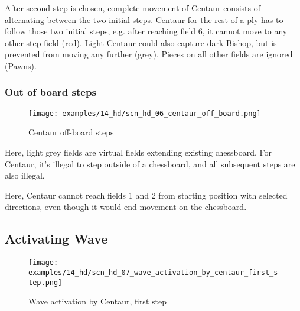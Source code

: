 After second step is chosen, complete movement of Centaur consists of alternating
between the two initial steps. Centaur for the rest of a ply has to follow those two
initial steps, e.g. after reaching field 6, it cannot move to any other step-field
(red). Light Centaur could also capture dark Bishop, but is prevented from moving
any further (grey). Pieces on all other fields are ignored (Pawns).

\clearpage %

\subsubsection*{Out of board steps}
\label{sec:Hemera's Dawn/Centaur/Movement/Out of board steps}

\vspace*{-1.3\baselineskip}
\noindent
\begin{figure}[!h]
\texttt{[image: examples/14\_hd/scn\_hd\_06\_centaur\_off\_board.png]}
\caption{Centaur off-board steps}
\label{fig:scn_hd_06_centaur_off_board}
\end{figure}

Here, light grey fields are virtual fields extending existing chessboard. For
Centaur, it's illegal to step outside of a chessboard, and all subsequent steps
are also illegal.

Here, Centaur cannot reach fields 1 and 2 from starting position with selected
directions, even though it would end movement on the chessboard.

\clearpage %

\subsection*{Activating Wave}
\label{sec:Hemera's Dawn/Centaur/Activating Wave}

\vspace*{-1.3\baselineskip}
\noindent
\begin{figure}[!h]
\texttt{[image: examples/14\_hd/scn\_hd\_07\_wave\_activation\_by\_centaur\_first\_step.png]}
\caption{Wave activation by Centaur, first step}
\label{fig:scn_hd_07_wave_activation_by_centaur_first_step}
\end{figure}

